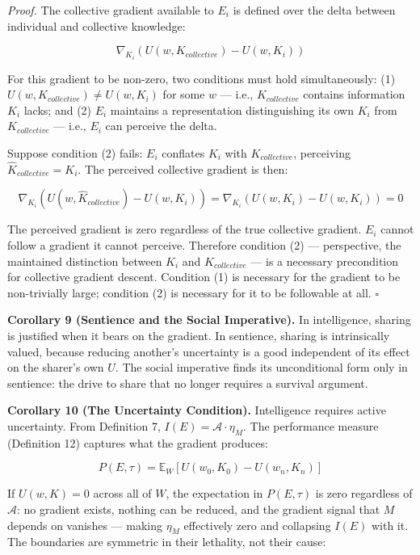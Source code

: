\documentclass[
]{article}
\begin{document}
\emph{Proof.} The collective gradient available to \(E_i\) is defined
over the delta between individual and collective knowledge:

\[\nabla_{K_i}\!\left(U(w, K_{collective}) - U(w, K_i)\right)\]

For this gradient to be non-zero, two conditions must hold
simultaneously: (1) \(U(w, K_{collective}) \neq U(w, K_i)\) for some
\(w\) --- i.e., \(K_{collective}\) contains information \(K_i\) lacks;
and (2) \(E_i\) maintains a representation distinguishing its own
\(K_i\) from \(K_{collective}\) --- i.e., \(E_i\) can perceive the
delta.

Suppose condition (2) fails: \(E_i\) conflates \(K_i\) with
\(K_{collective}\), perceiving \(\hat{K}_{collective} = K_i\). The
perceived collective gradient is then:

\[\nabla_{K_i}\!\left(U(w, \hat{K}_{collective}) - U(w, K_i)\right) = \nabla_{K_i}\!\left(U(w, K_i) - U(w, K_i)\right) = 0\]

The perceived gradient is zero regardless of the true collective
gradient. \(E_i\) cannot follow a gradient it cannot perceive. Therefore
condition (2) --- perspective, the maintained distinction between
\(K_i\) and \(K_{collective}\) --- is a necessary precondition for
collective gradient descent. Condition (1) is necessary for the gradient
to be non-trivially large; condition (2) is necessary for it to be
followable at all. \(\square\)

\textbf{Corollary 9 (Sentience and the Social Imperative).} In
intelligence, sharing is justified when it bears on the gradient. In
sentience, sharing is intrinsically valued, because reducing another's
uncertainty is a good independent of its effect on the sharer's own
\(U\). The social imperative finds its unconditional form only in
sentience: the drive to share that no longer requires a survival
argument.

\textbf{Corollary 10 (The Uncertainty Condition).} Intelligence requires
active uncertainty. From Definition 7,
\(I(E) = \mathcal{A} \cdot \eta_M\). The performance measure (Definition
12) captures what the gradient produces:

\[P(E, \tau) = \mathbb{E}_W\left[U(w_0, K_0) - U(w_n, K_n)\right]\]

If \(U(w, K) = 0\) across all of \(W\), the expectation in
\(P(E, \tau)\) is zero regardless of \(\mathcal{A}\): no gradient
exists, nothing can be reduced, and the gradient signal that \(M\)
depends on vanishes --- making \(\eta_M\) effectively zero and
collapsing \(I(E)\) with it. The boundaries are symmetric in their
lethality, not their cause:
\end{document}
